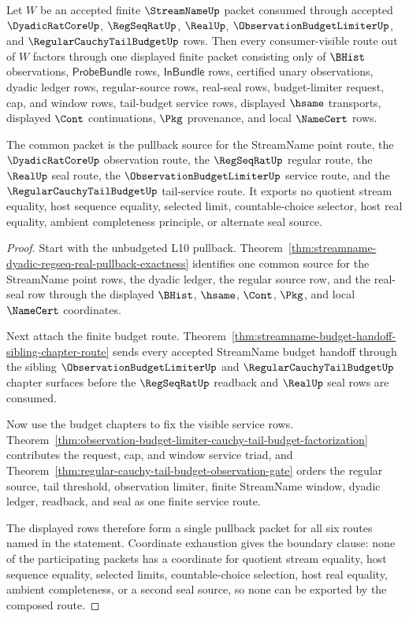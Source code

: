 \begin{theorem}
\label{thm:streamname-budgeted-l10-pullback-exactness}
Let $W$ be an accepted finite $\StreamNameUp$ packet consumed through accepted $\DyadicRatCoreUp$, $\RegSeqRatUp$, $\RealUp$, $\ObservationBudgetLimiterUp$, and $\RegularCauchyTailBudgetUp$ rows. Then every consumer-visible route out of $W$ factors through one displayed finite packet consisting only of $\BHist$ observations, $\mathsf{ProbeBundle}$ rows, $\mathsf{InBundle}$ rows, certified unary observations, dyadic ledger rows, regular-source rows, real-seal rows, budget-limiter request, cap, and window rows, tail-budget service rows, displayed $\hsame$ transports, displayed $\Cont$ continuations, $\Pkg$ provenance, and local $\NameCert$ rows.

The common packet is the pullback source for the StreamName point route, the $\DyadicRatCoreUp$ observation route, the $\RegSeqRatUp$ regular route, the $\RealUp$ seal route, the $\ObservationBudgetLimiterUp$ service route, and the $\RegularCauchyTailBudgetUp$ tail-service route. It exports no quotient stream equality, host sequence equality, selected limit, countable-choice selector, host real equality, ambient completeness principle, or alternate seal source.
\end{theorem}
\begin{proof}
Start with the unbudgeted L10 pullback. Theorem~\ref{thm:streamname-dyadic-regseq-real-pullback-exactness} identifies one common source for the StreamName point rows, the dyadic ledger, the regular source row, and the real-seal row through the displayed $\BHist$, $\hsame$, $\Cont$, $\Pkg$, and local $\NameCert$ coordinates.

Next attach the finite budget route. Theorem~\ref{thm:streamname-budget-handoff-sibling-chapter-route} sends every accepted StreamName budget handoff through the sibling $\ObservationBudgetLimiterUp$ and $\RegularCauchyTailBudgetUp$ chapter surfaces before the $\RegSeqRatUp$ readback and $\RealUp$ seal rows are consumed.

Now use the budget chapters to fix the visible service rows. Theorem~\ref{thm:observation-budget-limiter-cauchy-tail-budget-factorization} contributes the request, cap, and window service triad, and Theorem~\ref{thm:regular-cauchy-tail-budget-observation-gate} orders the regular source, tail threshold, observation limiter, finite StreamName window, dyadic ledger, readback, and seal as one finite service route.

The displayed rows therefore form a single pullback packet for all six routes named in the statement. Coordinate exhaustion gives the boundary clause: none of the participating packets has a coordinate for quotient stream equality, host sequence equality, selected limits, countable-choice selection, host real equality, ambient completeness, or a second seal source, so none can be exported by the composed route.
\end{proof}

